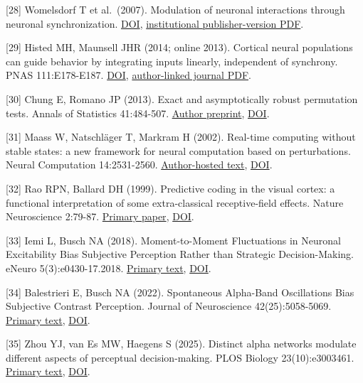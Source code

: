 \documentclass[
  american,
  11pt,
  letterpaper,
]{article}
\begin{document}
{[}28{]} Womelsdorf T et al.~(2007). Modulation of neuronal interactions through neuronal synchronization. \href{https://doi.org/10.1126/science.1139597}{DOI}, \href{https://pure.mpg.de/rest/items/item_1566173_3/component/file_1566384/content}{institutional publisher-version PDF}.

{[}29{]} Histed MH, Maunsell JHR (2014; online 2013). Cortical neural populations can guide behavior by integrating inputs linearly, independent of synchrony. PNAS 111:E178-E187. \href{https://doi.org/10.1073/pnas.1318750111}{DOI}, \href{https://histed.squarespace.com/s/Cortical-neuronal-networks-can-integrate-inputs-linearly-independent-of-synchrony.pdf}{author-linked journal PDF}.

{[}30{]} Chung E, Romano JP (2013). Exact and asymptotically robust permutation tests. Annals of Statistics 41:484-507. \href{https://arxiv.org/abs/1304.5939}{Author preprint}, \href{https://doi.org/10.1214/13-AOS1090}{DOI}.

{[}31{]} Maass W, Natschläger T, Markram H (2002). Real-time computing without stable states: a new framework for neural computation based on perturbations. Neural Computation 14:2531-2560. \href{https://igi-web.tugraz.at/PDF/130.pdf}{Author-hosted text}, \href{https://doi.org/10.1162/089976602760407955}{DOI}.

{[}32{]} Rao RPN, Ballard DH (1999). Predictive coding in the visual cortex: a functional interpretation of some extra-classical receptive-field effects. Nature Neuroscience 2:79-87. \href{https://www.ni.cmu.edu/~tai/microns_papers/rao_ballard.pdf}{Primary paper}, \href{https://doi.org/10.1038/4580}{DOI}.

{[}33{]} Iemi L, Busch NA (2018). Moment-to-Moment Fluctuations in Neuronal Excitability Bias Subjective Perception Rather than Strategic Decision-Making. eNeuro 5(3):e0430-17.2018. \href{https://pure.mpg.de/rest/items/item_3066647_2/component/file_3066649/content?download=true}{Primary text}, \href{https://doi.org/10.1523/ENEURO.0430-17.2018}{DOI}.

{[}34{]} Balestrieri E, Busch NA (2022). Spontaneous Alpha-Band Oscillations Bias Subjective Contrast Perception. Journal of Neuroscience 42(25):5058-5069. \href{https://pmc.ncbi.nlm.nih.gov/articles/PMC9233438/}{Primary text}, \href{https://doi.org/10.1523/JNEUROSCI.1972-21.2022}{DOI}.

{[}35{]} Zhou YJ, van Es MW, Haegens S (2025). Distinct alpha networks modulate different aspects of perceptual decision-making. PLOS Biology 23(10):e3003461. \href{https://pmc.ncbi.nlm.nih.gov/articles/PMC12561919/}{Primary text}, \href{https://doi.org/10.1371/journal.pbio.3003461}{DOI}.
\end{document}
